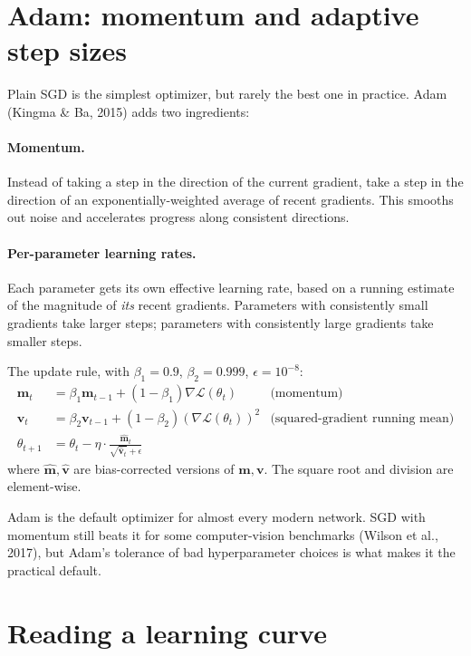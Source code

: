 \section{Adam: momentum and adaptive step sizes}

Plain SGD is the simplest optimizer, but rarely the best one in practice. Adam (Kingma \& Ba, 2015) adds two ingredients:

\paragraph{Momentum.} Instead of taking a step in the direction of the current gradient, take a step in the direction of an exponentially-weighted average of recent gradients. This smooths out noise and accelerates progress along consistent directions.

\paragraph{Per-parameter learning rates.} Each parameter gets its own effective learning rate, based on a running estimate of the magnitude of \emph{its} recent gradients. Parameters with consistently small gradients take larger steps; parameters with consistently large gradients take smaller steps.

The update rule, with $\beta_1 = 0.9$, $\beta_2 = 0.999$, $\epsilon = 10^{-8}$:
\begin{align*}
\bm{m}_t &= \beta_1 \bm{m}_{t-1} + (1 - \beta_1) \nabla \mathcal{L}(\theta_t) &\text{(momentum)} \\
\bm{v}_t &= \beta_2 \bm{v}_{t-1} + (1 - \beta_2) (\nabla \mathcal{L}(\theta_t))^2 &\text{(squared-gradient running mean)} \\
\theta_{t+1} &= \theta_t - \eta \cdot \frac{\hat{\bm{m}}_t}{\sqrt{\hat{\bm{v}}_t} + \epsilon}
\end{align*}
where $\hat{\bm{m}}, \hat{\bm{v}}$ are bias-corrected versions of $\bm{m}, \bm{v}$. The square root and division are element-wise.

Adam is the default optimizer for almost every modern network. SGD with momentum still beats it for some computer-vision benchmarks (Wilson et al., 2017), but Adam's tolerance of bad hyperparameter choices is what makes it the practical default.

\section{Reading a learning curve}


